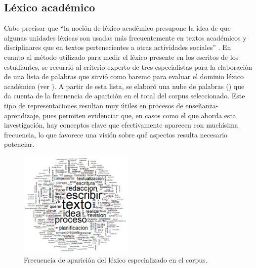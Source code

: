 \documentclass{textolivre}
\begin{document}
\subsection{Léxico académico}\label{sec-lex}
Cabe precisar que “la noción de léxico académico presupone la idea de
que algunas unidades léxicas son usadas más frecuentemente en textos académicos
y disciplinares que en textos pertenecientes a otras actividades sociales”
\cite[p. 251]{CisnerosEstupian2019}. En cuanto al método utilizado para medir el
léxico presente en los escritos de los estudiantes, se recurrió al criterio
experto de tres especialistas para la elaboración de una lista de palabras que
sirvió como baremo para evaluar el dominio léxico académico (ver ). A partir
de esta lista, se elaboró una nube de palabras () que da cuenta de la
frecuencia de aparición en el total del corpus seleccionado. Este tipo de
representaciones resultan muy útiles en procesos de enseñanza-aprendizaje,
pues permiten evidenciar que, en casos como el que aborda esta investigación,
hay conceptos clave que efectivamente aparecen con muchísima frecuencia, lo que
favorece una visión sobre qué aspectos resulta necesario potenciar.

\begin{figure}[htbp]
 \centering
 \includegraphics[width=0.5\textwidth]{figure01.png}
 \caption{Frecuencia de aparición del léxico especializado en el corpus.}
 \label{fig01}
\end{figure}
\end{document}
